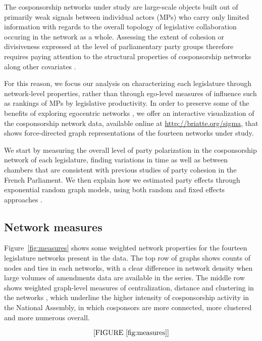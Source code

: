 The cosponsorship networks under study are large-scale objects built out of primarily weak signals between individual actors (MPs) who carry only limited information with regards to the overall topology of legislative collaboration occuring in the network as a whole. Assessing the extent of cohesion or divisiveness expressed at the level of parliamentary party groups therefore requires paying attention to the structural properties of cosponsorship networks along other covariates \citep{KirklandGross2012-SN}.%

For this reason, we focus our analysis on characterizing each legislature through network-level properties, rather than through ego-level measures of influence such as rankings of MPs by legislative productivity. In order to preserve some of the benefits of exploring egocentric networks \citep[see, e.g.]{Box-SteffensmeierChristenson2014-SN}, we offer an interactive visualization of the cosponsorship network data, available online at \url{http://briatte.org/sigma}, that shows force-directed graph representations of the fourteen networks under study.%

We start by measuring the overall level of party polarization in the cosponsorship network of each legislature, finding variations in time as well as between chambers that are consistent with previous studies of party cohesion in the French Parliament. We then explain how we estimated party effects through exponential random graph models, using both random and fixed effects approaches \citep{KrivitskyHandcock2009-SN,CranmerDesmarais2011-PA}.%

\subsection{Network measures}

Figure~\ref{fig:measures} shows some weighted network properties for the fourteen legislature networks present in the data. The top row of graphs shows counts of nodes and ties in each networks, with a clear difference in network density when large volumes of amendments data are available in the series. The middle row shows weighted graph-level measures of centralization, distance and clustering in the networks \citep{OpsahlPanzarasa2009-SN,OpsahlAgneessens2010-SN}, which underline the higher intensity of cosponsorship activity in the National Assembly, in which cosponsors are more connected, more clustered and more numerous overall.%

$$\textrm{[FIGURE~\ref{fig:measures}]}$$

